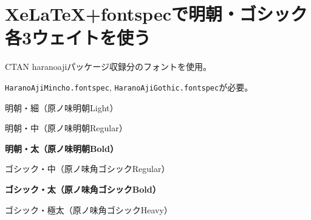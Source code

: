 \documentclass[xelatex,ja=standard]{bxjsarticle}
\begin{document}
\section{Xe\LaTeX +fontspecで明朝・ゴシック各3ウェイトを使う}

CTAN haranoajiパッケージ収録分のフォントを使用。

\texttt{HaranoAjiMincho.fontspec},
\texttt{HaranoAjiGothic.fontspec}が必要。

\vspace{\baselineskip}

\rmfamily
\mcfamily
{}\selectfont
明朝・細（原ノ味明朝Light）

\mdseries
明朝・中（原ノ味明朝Regular）

\bfseries
明朝・太（原ノ味明朝Bold）

\sffamily
\gtfamily
\mdseries
ゴシック・中（原ノ味角ゴシックRegular）

\bfseries
ゴシック・太（原ノ味角ゴシックBold）

\selectfont
ゴシック・極太（原ノ味角ゴシックHeavy）
\end{document}
